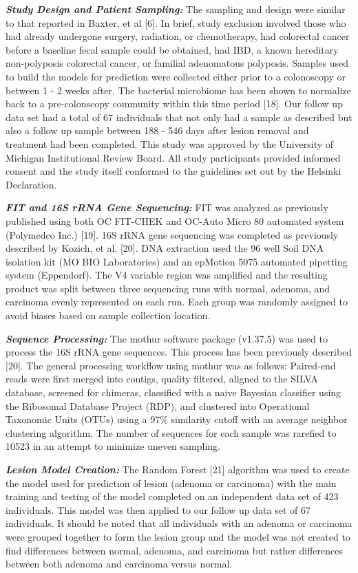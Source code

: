 \documentclass[12pt,]{article}
\begin{document}
\textbf{\emph{Study Design and Patient Sampling:}} The sampling and
design were similar to that reported in Baxter, et al {[}6{]}. In brief,
study exclusion involved those who had already undergone surgery,
radiation, or chemotherapy, had colorectal cancer before a baseline
fecal sample could be obtained, had IBD, a known hereditary
non-polyposis colorectal cancer, or familial adenomatous polyposis.
Samples used to build the models for prediction were collected either
prior to a colonoscopy or between 1 - 2 weeks after. The bacterial
microbiome has been shown to normalize back to a pre-colonscopy
community within this time period {[}18{]}. Our follow up data set had a
total of 67 individuals that not only had a sample as described but also
a follow up sample between 188 - 546 days after lesion removal and
treatment had been completed. This study was approved by the University
of Michigan Institutional Review Board. All study participants provided
informed consent and the study itself conformed to the guidelines set
out by the Helsinki Declaration.

\textbf{\emph{FIT and 16S rRNA Gene Sequencing:}} FIT was analyzed as
previously published using both OC FIT-CHEK and OC-Auto Micro 80
automated system (Polymedco Inc.) {[}19{]}. 16S rRNA gene sequencing was
completed as previously described by Kozich, et al. {[}20{]}. DNA
extraction used the 96 well Soil DNA isolation kit (MO BIO Laboratories)
and an epMotion 5075 automated pipetting system (Eppendorf). The V4
variable region was amplified and the resulting product was split
between three sequencing runs with normal, adenoma, and carcinoma evenly
represented on each run. Each group was randomly assigned to avoid
biases based on sample collection location.

\textbf{\emph{Sequence Processing:}} The mothur software package
(v1.37.5) was used to process the 16S rRNA gene sequences. This process
has been previously described {[}20{]}. The general processing workflow
using mothur was as follows: Paired-end reads were first merged into
contigs, quality filtered, aligned to the SILVA database, screened for
chimeras, classified with a naive Bayesian classifier using the
Ribosomal Database Project (RDP), and clustered into Operational
Taxonomic Units (OTUs) using a 97\% similarity cutoff with an average
neighbor clustering algorithm. The number of sequences for each sample
was rarefied to 10523 in an attempt to minimize uneven sampling.

\textbf{\emph{Lesion Model Creation:}} The Random Forest {[}21{]}
algorithm was used to create the model used for prediction of lesion
(adenoma or carcinoma) with the main training and testing of the model
completed on an independent data set of 423 individuals. This model was
then applied to our follow up data set of 67 individuals. It should be
noted that all individuals with an adenoma or carcinoma were grouped
together to form the lesion group and the model was not created to find
differences between normal, adenoma, and carcinoma but rather
differences between both adenoma and carcinoma versus normal.
\end{document}
